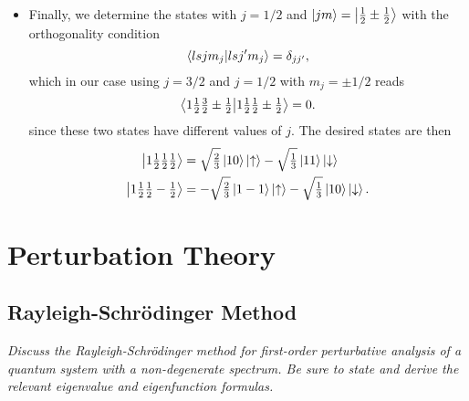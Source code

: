 \documentclass[11pt, a4paper]{article}
\newcommand{\Schro}{Schr\"{o}dinger\xspace}
\newcommand{\ua}{\uparrow}  %
\newcommand{\da}{\downarrow}  %
\begin{document}
\begin{itemize}
    \item Finally, we determine the states with $ j = 1/2 $ and $ \ket{jm} = \ket{\tfrac{1}{2} \pm \tfrac{1}{2}} $ with the orthogonality condition
    \begin{equation*}
        \braket{lsjm_{j}}{lsj'm_{j}} = \delta_{jj'},
    \end{equation*}
    which in our case using $ j = 3/2 $ and $ j = 1/2 $ with $ m_{j} = \pm 1/2 $ reads
    \begin{equation*}
        \braket{1 \tfrac{1}{2}\tfrac{3}{2}\pm \tfrac{1}{2}}{1 \tfrac{1}{2}\tfrac{1}{2}\pm \tfrac{1}{2}} = 0.
    \end{equation*}
    since these two states have different values of $ j $. The desired states are then
    \begin{align*}
        \ket{1 \tfrac{1}{2}\tfrac{1}{2}\tfrac{1}{2}} &= \sqrt{\tfrac{2}{3}}\ket{10} \ket{\ua} - \sqrt{\tfrac{1}{3}} \ket{11}\ket{\da}\\
        \ket{1 \tfrac{1}{2}\tfrac{1}{2}-\tfrac{1}{2}} &= -\sqrt{\tfrac{2}{3}}\ket{1-1} \ket{\ua} - \sqrt{\tfrac{1}{3}} \ket{10}\ket{\da}.
    \end{align*}
\end{itemize}


    
    
\newpage
\section{Perturbation Theory}

\subsection{Rayleigh-\Schro Method}
\textit{Discuss the Rayleigh-\Schro method for first-order perturbative analysis of a quantum system with a non-degenerate spectrum. Be sure to state and derive the relevant eigenvalue and eigenfunction formulas.}
\end{document}
